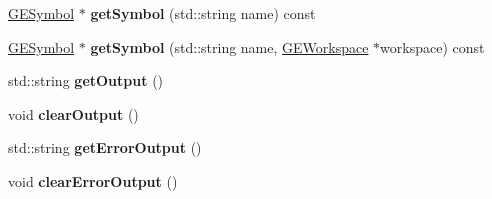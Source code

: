 \begin{DoxyCompactItemize}
\hyperlink{class_g_e_symbol}{G\+E\+Symbol} $\ast$ {\bfseries get\+Symbol} (std\+::string name) const
\item 
\mbox{\label{class_g_a_u_s_s_a0e7f4b748e421feb61e62591b6c342ad}} 
\hyperlink{class_g_e_symbol}{G\+E\+Symbol} $\ast$ {\bfseries get\+Symbol} (std\+::string name, \hyperlink{class_g_e_workspace}{G\+E\+Workspace} $\ast$workspace) const
\item 
\mbox{\label{class_g_a_u_s_s_a4aaf36cbdd2edb0d14bd705bc1ee161e}} 
std\+::string {\bfseries get\+Output} ()
\item 
\mbox{\label{class_g_a_u_s_s_a559e0215a8d9f6d24b9258927bb24533}} 
void {\bfseries clear\+Output} ()
\item 
\mbox{\label{class_g_a_u_s_s_a710dea1e26b3af12dfed9092323fecd5}} 
std\+::string {\bfseries get\+Error\+Output} ()
\item 
\mbox{\label{class_g_a_u_s_s_a7de5e45505c311bb52cb2f1c8f827d58}} 
void {\bfseries clear\+Error\+Output} ()
\end{DoxyCompactItemize}
